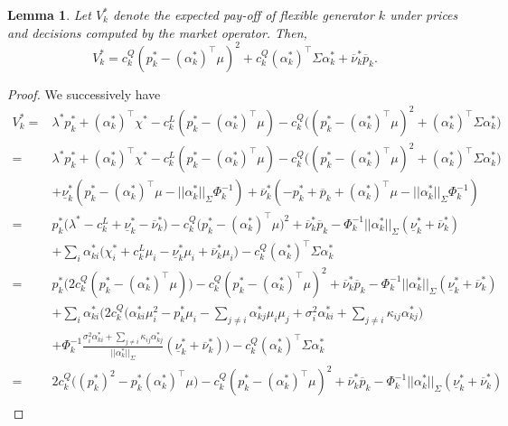 \documentclass{article}
\newtheorem{lemma}{Lemma}
\begin{document}
\begin{lemma}\label{ExpectedPayOff}
Let $V_k^*$ denote the expected pay-off of flexible generator $k$ under prices and decisions computed by the market operator. Then,
\begin{equation*}
V_k^* = c_k^Q(p_k^* - (\alpha_k^*)^\top \mu)^2 + c_k^Q (\alpha_k^*)^\top \Sigma \alpha_k^* + \overline{\nu}_k^* \overline{p}_k.
\end{equation*}
\end{lemma}
\begin{proof}
We successively have
\begin{align*}
    V_k^* =& \lambda^*p_k^* + (\alpha_k^*)^\top\chi^* - c_k^L(p_k^* - (\alpha_k^*)^\top \mu) - c_k^Q\big((p_k^* - (\alpha_k^*)^\top \mu)^2 + (\alpha_k^*)^\top\Sigma \alpha_k^*\big) \\
    =& \lambda^*p_k^* + (\alpha_k^*)^\top\chi^* - c_k^L(p_k^* - (\alpha_k^*)^\top \mu) - c_k^Q\big((p_k^* - (\alpha_k^*)^\top \mu)^2 + (\alpha_k^*)^\top\Sigma \alpha_k^*\big)\\
   &+ \underline{\nu}_k^*(p_k^* - (\alpha_k^*)^\top \mu - ||\alpha_k^*||_{\Sigma} \Phi_k^{-1}) + \overline{\nu}_k^* (-p_k^* + \overline{p}_k + (\alpha_k^*)^\top \mu - ||\alpha_k^*||_{\Sigma} \Phi_k^{-1})\\
=& p_k^*\big(\lambda^* - c_k^L + \underline{\nu}_k^* - \overline{\nu}_k^*\big) - c_k^Q\big(p_k^* - (\alpha_k^*)^\top \mu\big)^2 + \overline{\nu}_k^* \overline{p}_k - \Phi_k^{-1}||\alpha_k^*||_{\Sigma} (\underline{\nu}_k^* + \overline{\nu}_k^*)\\
    &+ \sum_i \alpha_{ki}^*\big(\chi_i^* + c_k^L \mu_i - \underline{\nu}_k^* \mu_i + \overline{\nu}_k^* \mu_i\big) - c_k^Q (\alpha_k^*)^\top\Sigma \alpha_k^* \\
    =& p_k^*\big(2c_k^Q(p_k^* - (\alpha_k^*)^\top \mu)\big) - c_k^Q(p_k^* - (\alpha_k^*)^\top \mu)^2 + \overline{\nu}_k^* \overline{p}_k - \Phi_k^{-1}||\alpha_k^*||_{\Sigma} (\underline{\nu}_k^* + \overline{\nu}_k^*)\\ 
    &+ \sum_i \alpha_{ki}^*\Big(2c_k^Q\big(\alpha_{ki}^*\mu_i^2 - p_k^* \mu_i - \sum_{j \ne i} \alpha_{kj}^* \mu_i \mu_j + \sigma_i^2 \alpha_{ki}^* + \sum_{j \ne i} \kappa_{ij} \alpha_{kj}^*\big) \\
    &+ \Phi_k^{-1} \frac{\sigma_i^2 \alpha_{ki}^* + \sum_{j \ne i} \kappa_{ij} \alpha_{kj}^*}{||\alpha_k^*||_\Sigma}(\underline{\nu}_k^* +\overline{\nu}_k^*)\Big) - c_k^Q (\alpha_k^*)^\top\Sigma \alpha_k^*\\
    =& 2c_k^Q\big((p_k^*)^2 - p_k^*(\alpha_k^*)^\top \mu\big) - c_k^Q(p_k^* - (\alpha_k^*)^\top \mu)^2 + \overline{\nu}_k^* \overline{p}_k - \Phi_k^{-1}||\alpha_k^*||_{\Sigma} (\underline{\nu}_k^* + \overline{\nu}_k^*)\\ 

\end{align*}
\end{proof}
\end{document}
